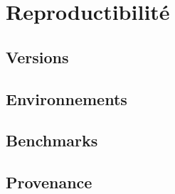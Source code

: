 \chapter{Reproductibilité}
\section{Versions}
\section{Environnements}
\section{Benchmarks}
\section{Provenance}
